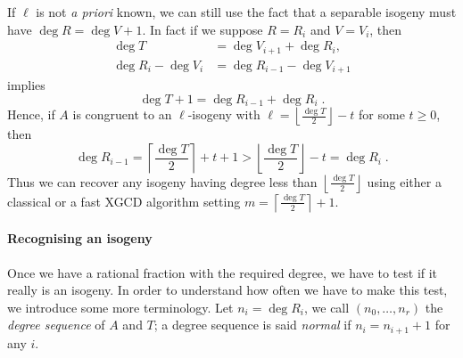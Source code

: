If $\ell$ is not \emph{a priori} known, we can still use the fact that
a separable isogeny must have $\deg R = \deg V + 1$. In fact if we
suppose $R = R_i$ and $V = V_i$, then
\begin{align*}
  \deg T &= \deg V_{i+1} + \deg R_i,\\
  \deg R_i - \deg V_i &= \deg R_{i-1} - \deg V_{i+1}
\end{align*}
implies
\begin{equation*}
  \deg T + 1 = \deg R_{i-1} + \deg R_i  
  \;\text{.}
\end{equation*}
Hence, if $A$ is congruent to an $\ell$-isogeny with $\ell =
\left\lfloor\frac{\deg T}{2}\right\rfloor - t$ for some $t\ge0$, then
\begin{equation}
  \label{eq:degseq}
  \deg R_{i-1} =
  \left\lceil\frac{\deg T}{2}\right\rceil + t + 1 >
  \left\lfloor\frac{\deg T}{2}\right\rfloor - t = \deg R_i
  \;\text{.}
\end{equation}
Thus we can recover any isogeny having degree less than
$\left\lfloor\frac{\deg T}{2}\right\rfloor$ using either a classical
or a fast XGCD algorithm setting $m = \left\lceil\frac{\deg
    T}{2}\right\rceil + 1$.


\paragraph{Recognising an isogeny}
Once we have a rational fraction with the required degree, we have to
test if it really is an isogeny. In order to understand how often we
have to make this test, we introduce some more terminology. Let $n_i =
\deg R_i$, we call $(n_0,\ldots,n_r)$ the \emph{degree sequence} of
$A$ and $T$; a degree sequence is said \emph{normal} if $n_i = n_{i+1}
+ 1$ for any $i$.

